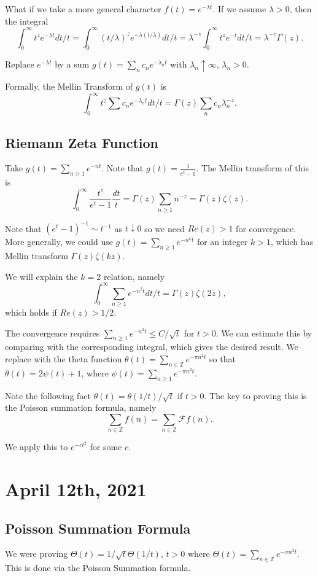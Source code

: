 \documentclass[12pt]{scrartcl}
\newcommand{\Z}{\mathbb{Z}}
\let \mc \mathcal
\begin{document}
What if we take a more general character $f(t) = e^{-\lambda t}$.  If we assume $\lambda > 0$, then the integral
$$\int_0^\infty t^z e^{-\lambda t} dt/t = \int_0^\infty (t/\lambda)^z e^{-\lambda(t/\lambda)}dt/t = \lambda^{-z} \int_0^\infty t^z e^{-t}dt/t = \lambda^{-z} \Gamma(z).$$ 

Replace $e^{-\lambda t}$ by a sum $g(t) = \sum_n c_n e^{-\lambda_n t}$ with $\lambda_n \uparrow \infty$, $\lambda_n > 0$.

Formally, the Mellin Transform of $g(t)$ is 
$$\int_0^\infty t^z \sum c_n e^{-\lambda_n t} dt/t = \Gamma(z) \sum_n c_n \lambda_n^{-z}.$$

\subsection{Riemann Zeta Function}
Take $g(t) = \sum_{n \ge 1} e^{-nt}$.  Note that $g(t) = \frac{1}{e^t - 1}$.  The Mellin transform of this is 
$$\int_0^\infty \frac{t^z}{e^t - 1} \frac{dt}{t} = \Gamma(z) \sum_{n \ge 1} n^{-z}= \Gamma(z) \zeta(z).$$

Note that $(e^t - 1)^{-1} \sim t^{-1}$ as $t \downarrow 0$ so we need $Re(z) > 1$ for convergence.  More generally, we could use $g(t) = \sum_{n \ge 1} e^{-n^k t}$ for an integer $k > 1$, which has Mellin transform $\Gamma(z) \zeta(kz)$.

We will explain the $k = 2$ relation, namely
$$\int_0^\infty \sum_{n \ge 1} e^{-n^2 t} dt/t = \Gamma(z) \zeta(2z),$$
which holds if $Re(z) > 1/2$.

The convergence requires $\sum_{n \ge 1} e^{-n^2 t} \le C/\sqrt{t}$ for $t > 0$.  We can estimate this by comparing with the corresponding integral, which gives the desired result.  We replace with the theta function $\theta(t) = \sum_{n \in \Z} e^{-\pi n^2 t}$ so that $\theta(t) = 2\psi(t) + 1$, where $\psi(t) = \sum_{n \ge 1} e^{-\pi n^2 t}$.

Note the following fact $\theta(t) = \theta(1/t)/\sqrt{t} $ if $t > 0$.  The key to proving this is the Poisson summation formula, namely
$$\sum_{n \in \Z} f(n) = \sum_{n \in \Z} \mc F f(n).$$

We apply this to $e^{-ct^2}$ for some $c$.  

\pagebreak
\section{April 12th, 2021}
\subsection{Poisson Summation Formula}
We were proving $\Theta(t) = 1/\sqrt{t}\Theta(1/t)$, $t > 0$ where $\Theta(t) = \sum_{n \in \Z} e^{-\pi n^2 t}$.  This is done via the Poisson Summation formula.  
\end{document}
